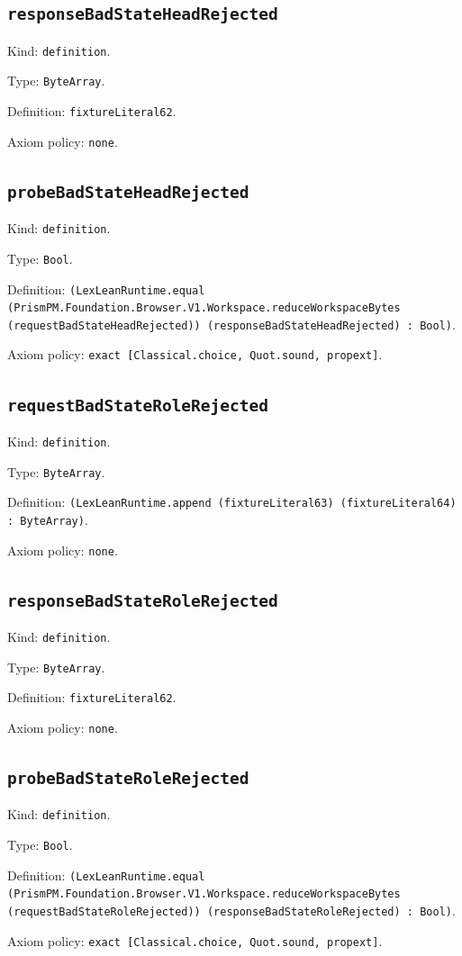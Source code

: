 \documentclass[11pt]{article}
\begin{document}
\subsection*{\texttt{responseBadStateHeadRejected}}
\noindent Kind: \texttt{definition}.\par
\noindent Type: \texttt{ByteArray}.\par
\noindent Definition: \texttt{fixtureLiteral62}.\par
\noindent Axiom policy: \texttt{none}.\par
\subsection*{\texttt{probeBadStateHeadRejected}}
\noindent Kind: \texttt{definition}.\par
\noindent Type: \texttt{Bool}.\par
\noindent Definition: \texttt{(LexLeanRuntime.equal (PrismPM.Foundation.Browser.V1.Workspace.reduceWorkspaceBytes (requestBadStateHeadRejected)) (responseBadStateHeadRejected) : Bool)}.\par
\noindent Axiom policy: \texttt{exact [Classical.choice, Quot.sound, propext]}.\par
\subsection*{\texttt{requestBadStateRoleRejected}}
\noindent Kind: \texttt{definition}.\par
\noindent Type: \texttt{ByteArray}.\par
\noindent Definition: \texttt{(LexLeanRuntime.append (fixtureLiteral63) (fixtureLiteral64) : ByteArray)}.\par
\noindent Axiom policy: \texttt{none}.\par
\subsection*{\texttt{responseBadStateRoleRejected}}
\noindent Kind: \texttt{definition}.\par
\noindent Type: \texttt{ByteArray}.\par
\noindent Definition: \texttt{fixtureLiteral62}.\par
\noindent Axiom policy: \texttt{none}.\par
\subsection*{\texttt{probeBadStateRoleRejected}}
\noindent Kind: \texttt{definition}.\par
\noindent Type: \texttt{Bool}.\par
\noindent Definition: \texttt{(LexLeanRuntime.equal (PrismPM.Foundation.Browser.V1.Workspace.reduceWorkspaceBytes (requestBadStateRoleRejected)) (responseBadStateRoleRejected) : Bool)}.\par
\noindent Axiom policy: \texttt{exact [Classical.choice, Quot.sound, propext]}.\par
\end{document}
